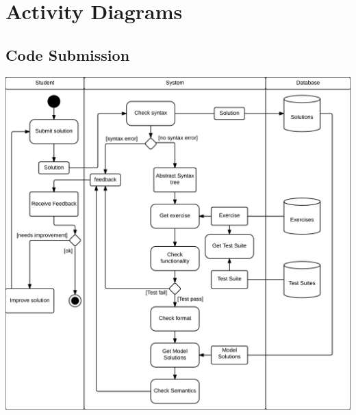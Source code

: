 

\section{Activity Diagrams}
\subsection{Code Submission}
\includegraphics[scale=0.8]{diagrams-images/code-submission-activity-diagram}

